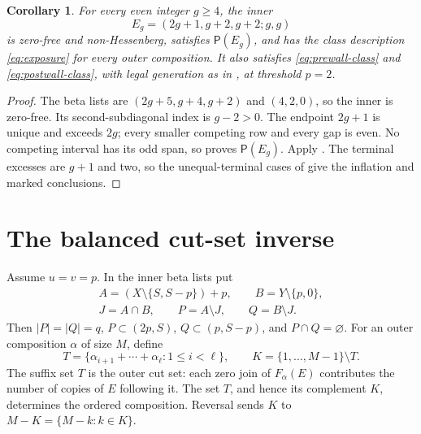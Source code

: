 \documentclass[11pt,a4paper]{amsart}
\numberwithin{equation}{section}
\theoremstyle{plain}
\newtheorem{corollary}[theorem]{Corollary}
\theoremstyle{definition}
\begin{document}
\begin{corollary}\label{cor:non-hessenberg-family}
For every even integer \(g\ge4\), the inner
\[
 E_g=(2g+1,g+2,g+2;g,g)
\]
is zero-free and non-Hessenberg, satisfies \(\mathsf P(E_g)\), and has the class description \eqref{eq:exposure} for every outer composition.  It also satisfies \eqref{eq:prewall-class} and \eqref{eq:postwall-class}, with legal generation as in , at threshold \(p=2\).
\end{corollary}
\begin{proof}
The beta lists are \((2g+5,g+4,g+2)\) and \((4,2,0)\), so the inner is zero-free.  Its second-subdiagonal index is \(g-2>0\).  The endpoint \(2g+1\) is unique and exceeds \(2g\); every smaller competing row and every gap is even.  No competing interval has its odd span, so  proves \(\mathsf P(E_g)\).  Apply .  The terminal excesses are \(g+1\) and two, so the unequal-terminal cases of  give the inflation and marked conclusions.
\end{proof}

\section{The balanced cut-set inverse}\label{sec:balanced}

Assume \(u=v=p\).  In the inner beta lists put
\begin{equation}\label{eq:balanced-data}
 \begin{gathered}
 A=(X\setminus\{S,S-p\})+p,\qquad B=Y\setminus\{p,0\},\\
 J=A\cap B,\qquad P=A\setminus J,\qquad Q=B\setminus J.
 \end{gathered}
\end{equation}
Then \(|P|=|Q|=q\), \(P\subset(2p,S)\), \(Q\subset(p,S-p)\), and \(P\cap Q=\varnothing\).  For an outer composition \(\alpha\) of size \(M\), define
\begin{equation}\label{eq:cuts}
 T=\{\alpha_{i+1}+\cdots+\alpha_\ell:1\le i<\ell\},\qquad
 K=\{1,\ldots,M-1\}\setminus T.
\end{equation}
The suffix set \(T\) is the outer cut set: each zero join of \(F_\alpha(E)\) contributes the number of copies of \(E\) following it.  The set \(T\), and hence its complement \(K\), determines the ordered composition.  Reversal sends \(K\) to \(M-K=\{M-k:k\in K\}\).
\end{document}
